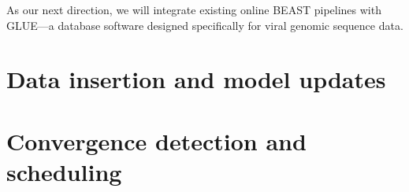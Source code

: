 As our next direction, we will integrate existing online BEAST pipelines with GLUE\cite{glue}---a database software designed specifically for viral genomic sequence data.



\section{Data insertion and model updates}

\section{Convergence detection and scheduling}








\cleardoublepage

